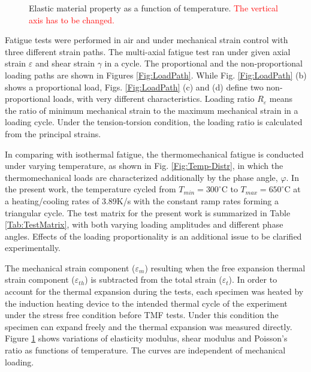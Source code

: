 \documentclass[preprint,5p,twocolumn,11pt,sort&compress]{elsarticle}
\newcommand{\marked}[1]{\textcolor{red}{#1}}
\begin{document}
\begin{figure}[!htp]
\caption{Elastic material property as a function of temperature. \marked{The vertical axis has to be changed.}}
\label{Fig:plot_elastic_by_temperature_in718}
\end{figure}

Fatigue tests were performed in air and under mechanical strain control with three different strain paths. The multi-axial fatigue test  ran under given axial strain $\varepsilon$ and shear strain $\gamma$ in a cycle. The proportional and the non-proportional loading paths are shown in Figures \ref{Fig:LoadPath}. While Fig. \ref{Fig:LoadPath} (b) shows a proportional load,  Figs. \ref{Fig:LoadPath} (c) and (d) define two non-proportional loads, with very different characteristics.
Loading ratio $R_\varepsilon$ means the ratio of minimum mechanical strain to the maximum mechanical strain in a loading cycle. Under the tension-torsion condition, the loading ratio is calculated from the principal strains.

In comparing with isothermal fatigue, the thermomechanical fatigue is conducted under varying temperature, as shown in Fig. \ref{Fig:Temp-Distr}, in which the thermomechanical loads are characterized additionally by the phase angle, $\varphi$. In the present work, the temperature cycled from $T_{min}=300^\circ$C to $T_{max}=650^\circ$C at a heating/cooling rates of 3.89K/s with the constant ramp rates forming a triangular cycle. The test matrix for the present work is summarized in Table \ref{Tab:TestMatrix}, with both varying loading amplitudes and different phase angles. Effects of the loading proportionality is an additional issue to be clarified experimentally.

The mechanical strain component ($\varepsilon_{m}$) resulting when the free expansion thermal strain component ($\varepsilon_{th}$) is subtracted from the total strain ($\varepsilon_{t}$). In order to account for the thermal expansion during the tests, each specimen was heated by the induction heating device to the intended thermal cycle of the experiment under the  stress free condition before TMF tests. Under this condition the specimen can expand freely and the thermal expansion was measured directly.
Figure \ref{Fig:plot_elastic_by_temperature_in718} shows variations of elasticity modulus, shear modulus and Poisson's ratio as functions of temperature. The curves are independent of mechanical loading.
\end{document}
